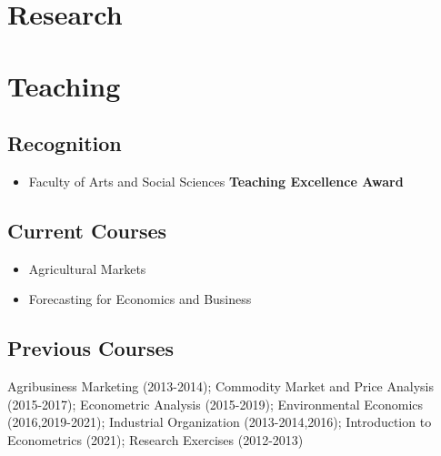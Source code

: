 \documentclass[10pt]{article}
\begin{document}
	\section*{Research}
	
	\begin{refsection}[papers]
		\nocite{ubilava2022ajae,ferguson2022,ubilava2022agec,hastings2022,angus2021,atalay2021,ubilava2019el,ubilava2019erl,ubilava2019md,ubilava2018ajae,smith2017gec,ubilava2017wd,tack2015agec,ubilava2014erae,tack2013cc,ubilava2013ems,ubilava2013ajare,ubilava2012agec,ubilava2012agri,ubilava2011jare,ubilava2011jcb,ubilava2010tfsc,ubilava2009fp}
		\printbibliography[heading=none]
	\end{refsection}

	\section*{Teaching}
	
	\subsection*{Recognition}
	\begin{itemize}
		\item {} Faculty of Arts and Social Sciences \textbf{Teaching Excellence Award}
	\end{itemize}
	\subsection*{Current Courses}
	\begin{itemize}
		\item {} Agricultural Markets
		\item {} Forecasting for Economics and Business
	\end{itemize}
	
	\subsection*{Previous Courses}	
	Agribusiness Marketing (2013-2014); Commodity Market and Price Analysis (2015-2017); Econometric Analysis (2015-2019); Environmental Economics (2016,2019-2021); Industrial Organization (2013-2014,2016); Introduction to Econometrics (2021); Research Exercises (2012-2013)
	
\end{document}
